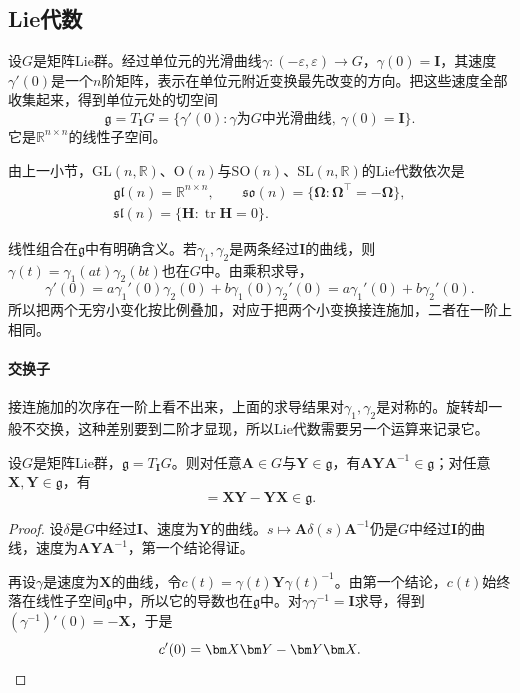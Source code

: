 \subsection{Lie代数}
\label{sec:lie-lie-algebra}

设$G$是矩阵Lie群。经过单位元的光滑曲线$\gamma:(-\varepsilon,\varepsilon)\to G$，$\gamma(0)=\bm I$，其速度$\gamma'(0)$是一个$n$阶矩阵，表示在单位元附近变换最先改变的方向。把这些速度全部收集起来，得到单位元处的切空间
\[
\mathfrak g=T_{\bm I}G=\{\gamma'(0):\gamma\text{为}G\text{中光滑曲线},\ \gamma(0)=\bm I\}.
\]
它是$\mathbb R^{n\times n}$的线性子空间。

由上一小节，$\mathrm{GL}(n,\mathbb R)$、$\mathrm O(n)$与$\mathrm{SO}(n)$、$\mathrm{SL}(n,\mathbb R)$的Lie代数依次是
\[
\begin{gathered}
\mathfrak{gl}(n)=\mathbb R^{n\times n},\qquad
\mathfrak{so}(n)=\{\bm\Omega:\bm\Omega^\top=-\bm\Omega\},\\
\mathfrak{sl}(n)=\{\bm H:\operatorname{tr}\bm H=0\}.
\end{gathered}
\]

线性组合在$\mathfrak g$中有明确含义。若$\gamma_1,\gamma_2$是两条经过$\bm I$的曲线，则$\gamma(t)=\gamma_1(at)\gamma_2(bt)$也在$G$中。由乘积求导，
\[
\gamma'(0)=a\gamma_1'(0)\gamma_2(0)+b\gamma_1(0)\gamma_2'(0)
=a\gamma_1'(0)+b\gamma_2'(0).
\]
所以把两个无穷小变化按比例叠加，对应于把两个小变换接连施加，二者在一阶上相同。

\paragraph{交换子}
接连施加的次序在一阶上看不出来，上面的求导结果对$\gamma_1,\gamma_2$是对称的。旋转却一般不交换，这种差别要到二阶才显现，所以Lie代数需要另一个运算来记录它。

\begin{theorem}[交换子封闭]
\label{thm:lie-bracket-closed}
设$G$是矩阵Lie群，$\mathfrak g=T_{\bm I}G$。则对任意$\bm A\in G$与$\bm Y\in\mathfrak g$，有$\bm A\bm Y\bm A^{-1}\in\mathfrak g$；对任意$\bm X,\bm Y\in\mathfrak g$，有
\begin{equation}
 [\bm X,\bm Y]=\bm X\bm Y-\bm Y\bm X\in\mathfrak g.
 \label{eq:lie-commutator}
\end{equation}
\end{theorem}

\begin{proof}
设$\delta$是$G$中经过$\bm I$、速度为$\bm Y$的曲线。$s\mapsto\bm A\delta(s)\bm A^{-1}$仍是$G$中经过$\bm I$的曲线，速度为$\bm A\bm Y\bm A^{-1}$，第一个结论得证。

再设$\gamma$是速度为$\bm X$的曲线，令$c(t)=\gamma(t)\bm Y\gamma(t)^{-1}$。由第一个结论，$c(t)$始终落在线性子空间$\mathfrak g$中，所以它的导数也在$\mathfrak g$中。对$\gamma\gamma^{-1}=\bm I$求导，得到$(\gamma^{-1})'(0)=-\bm X$，于是
\[
c'(0)=\bm X\bm Y-\bm Y\bm X.\qedhere
\]
\end{proof}

